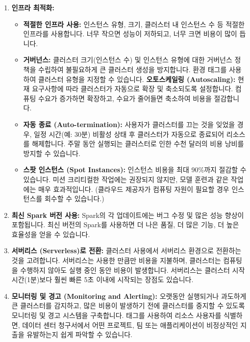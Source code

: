 \documentclass[11pt,a4paper]{article}
\theoremstyle{definition}
\begin{document}
\begin{enumerate}
    \item \textbf{인프라 최적화:}
    \begin{itemize}
        \item \textbf{적절한 인프라 사용:} 인스턴스 유형, 크기, 클러스터 내 인스턴스 수 등 적절한 인프라를 사용합니다. 너무 작으면 성능이 저하되고, 너무 크면 비용이 많이 듭니다.
        \item \textbf{거버넌스:} 클러스터 크기(인스턴스 수) 및 인스턴스 유형에 대한 거버넌스 정책을 수립하여 불필요하게 큰 클러스터 생성을 방지합니다. 환경 태그를 사용하여 클러스터 유형을 지정할 수 있습니다.
        \textbf{오토스케일링 (Autoscaling):} 현재 요구사항에 따라 클러스터가 자동으로 확장 및 축소되도록 설정합니다. 컴퓨팅 수요가 증가하면 확장하고, 수요가 줄어들면 축소하여 비용을 절감합니다.
        \item \textbf{자동 종료 (Auto-termination):} 사용자가 클러스터를 끄는 것을 잊었을 경우, 일정 시간(예: 30분) 비활성 상태 후 클러스터가 자동으로 종료되어 리소스를 해제합니다. 주말 동안 실행되는 클러스터로 인한 수천 달러의 비용 낭비를 방지할 수 있습니다.
        \item \textbf{스팟 인스턴스 (Spot Instances):} 인스턴스 비용을 최대 90\%까지 절감할 수 있습니다. 미션 크리티컬한 작업에는 권장되지 않지만, 모델 훈련과 같은 작업에는 매우 효과적입니다. (클라우드 제공자가 컴퓨팅 자원이 필요할 경우 인스턴스를 회수할 수 있습니다.)
    \end{itemize}

    \item \textbf{최신 Spark 버전 사용:}
    Spark의 각 업데이트에는 버그 수정 및 많은 성능 향상이 포함됩니다. 최신 버전의 Spark를 사용하면 더 나은 품질, 더 많은 기능, 더 높은 효율성을 얻을 수 있습니다.

    \item \textbf{서버리스 (Serverless)로 전환:}
    클러스터 사용에서 서버리스 환경으로 전환하는 것을 고려합니다. 서버리스는 사용한 만큼만 비용을 지불하며, 클러스터는 컴퓨팅을 수행하지 않아도 실행 중인 동안 비용이 발생합니다. 서버리스는 클러스터 시작 시간(1분)보다 훨씬 빠른 5초 이내에 시작되는 장점도 있습니다.

    \item \textbf{모니터링 및 경고 (Monitoring and Alerting):}
    오랫동안 실행되거나 과도하게 큰 클러스터를 감지하고, 많은 비용이 발생하기 전에 클러스터를 중지할 수 있도록 모니터링 및 경고 시스템을 구축합니다. 태그를 사용하여 리소스 사용자를 식별하면, 데이터 센터 청구서에서 어떤 프로젝트, 팀 또는 애플리케이션이 비정상적인 지출을 유발하는지 쉽게 파악할 수 있습니다.
\end{enumerate}
\end{document}
